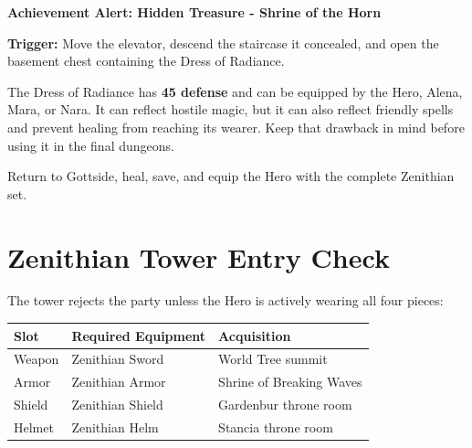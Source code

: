 \documentclass[
  american,
  10pt,
  letterpaper,
  oneside,
  open=any]{scrreprt}
\newcounter{none} %
\newenvironment{guidetable}{%
  \small\setstretch{1.0}%
  \setlength{\tabcolsep}{4pt}%
  \setlength{\LTpre}{8pt}\setlength{\LTpost}{10pt}%
  \renewcommand{\arraystretch}{1.16}%
}{ }
\begin{document}
\begin{achievementalert}

\textbf{Achievement Alert: Hidden Treasure - Shrine of the Horn}

\textbf{Trigger:} Move the elevator, descend the staircase it concealed,
and open the basement chest containing the Dress of Radiance.

\end{achievementalert}

The Dress of Radiance has \textbf{45 defense} and can be equipped by the
Hero, Alena, Mara, or Nara. It can reflect hostile magic, but it can
also reflect friendly spells and prevent healing from reaching its
wearer. Keep that drawback in mind before using it in the final
dungeons.

Return to Gottside, heal, save, and equip the Hero with the complete
Zenithian set.

\section{Zenithian Tower Entry Check}\label{zenithian-tower-entry-check}

The tower rejects the party unless the Hero is actively wearing all four
pieces:

\begin{guidetable}

{\def\LTcaptype{none} %
\begin{longtable}[]{@{}
  >{\raggedright\arraybackslash}p{}
  >{\raggedright\arraybackslash}p{}
  >{\raggedright\arraybackslash}p{}@{}}
\toprule\noalign{}
\begin{minipage}[b]{\linewidth}\raggedright
\color{GuideGreen}\bfseries Slot
\end{minipage} & \begin{minipage}[b]{\linewidth}\raggedright
\color{GuideGreen}\bfseries Required Equipment
\end{minipage} & \begin{minipage}[b]{\linewidth}\raggedright
\color{GuideGreen}\bfseries Acquisition
\end{minipage} \\
\midrule\noalign{}
\endhead
\bottomrule\noalign{}
\endlastfoot
Weapon & Zenithian Sword & World Tree summit \\
Armor & Zenithian Armor & Shrine of Breaking Waves \\
Shield & Zenithian Shield & Gardenbur throne room \\
Helmet & Zenithian Helm & Stancia throne room \\
\end{longtable}
}

\end{guidetable}
\end{document}
